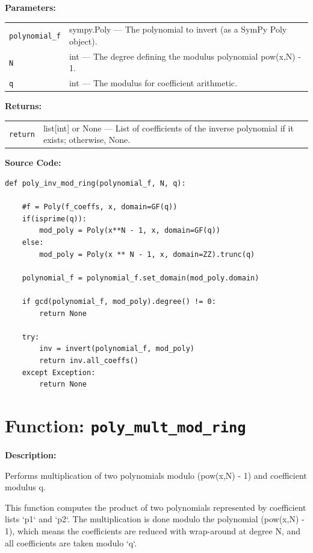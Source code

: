 \documentclass[a4paper,12pt]{article}
\begin{document}
\vspace{1em}

\newpage
\textbf{Parameters:}

\vspace{1em}
\noindent
\begin{tabular}{p{3cm} p{11cm}}
\texttt{polynomial\_f} & sympy.Poly — The polynomial to invert (as a SymPy Poly object). \\
\texttt{N} & int — The degree defining the modulus polynomial pow(x,N) - 1. \\
\texttt{q} & int — The modulus for coefficient arithmetic. \\
\end{tabular}

\vspace{1em}
\noindent
\textbf{Returns:}

\begin{tabular}{p{3cm} p{11cm}}
\texttt{return} & list[int] or None — List of coefficients of the inverse polynomial if it exists; otherwise, None. \\
\end{tabular}

\vspace{1em}
\textbf{Source Code:}

\begin{lstlisting}
def poly_inv_mod_ring(polynomial_f, N, q):

    #f = Poly(f_coeffs, x, domain=GF(q))
    if(isprime(q)):
        mod_poly = Poly(x**N - 1, x, domain=GF(q))
    else:
        mod_poly = Poly(x ** N - 1, x, domain=ZZ).trunc(q)

    polynomial_f = polynomial_f.set_domain(mod_poly.domain)

    if gcd(polynomial_f, mod_poly).degree() != 0:
        return None

    try:
        inv = invert(polynomial_f, mod_poly)
        return inv.all_coeffs()
    except Exception:
        return None
\end{lstlisting}

\section*{Function: \texttt{poly\_mult\_mod\_ring}}

\textbf{Description:}

Performs multiplication of two polynomials modulo (pow(x,N) - 1) and coefficient modulus q.

This function computes the product of two polynomials represented by coefficient lists `p1` and `p2`.
The multiplication is done modulo the polynomial (pow(x,N) - 1), which means the coefficients
are reduced with wrap-around at degree N, and all coefficients are taken modulo `q`.
\end{document}
